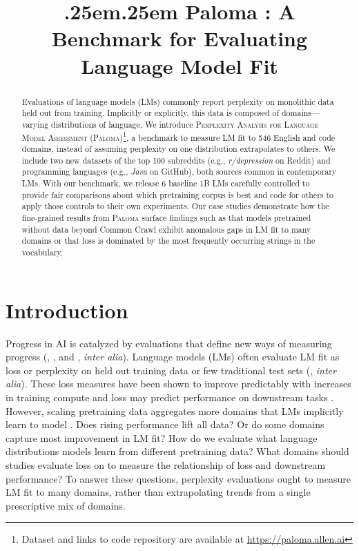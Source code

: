 \title{.25em{{.25em{ Paloma}}} : A Benchmark for Evaluating Language Model Fit}

\begin{abstract}
Evaluations of language models (LMs) commonly report perplexity on monolithic data held out from training. Implicitly or explicitly, this data is composed of domains—varying distributions of language. We introduce \textsc{Perplexity Analysis for Language Model Assessment} (\textsc{Paloma})\footnote{Dataset and links to code repository are available at \url{https://paloma.allen.ai}}, a benchmark to measure LM fit to 546 English and code domains, instead of assuming perplexity on one distribution extrapolates to others. We include two new datasets of the top 100 subreddits (e.g., \textit{r/depression} on Reddit) and programming languages (e.g., \textit{Java} on GitHub), both sources common in contemporary LMs. With our benchmark, we release 6 baseline 1B LMs carefully controlled to provide fair comparisons about which pretraining corpus is best and code for others to apply those controls to their own experiments. Our case studies demonstrate how the fine-grained results from \textsc{Paloma} surface findings such as that models pretrained without data beyond Common Crawl exhibit anomalous gaps in LM fit to many domains or that loss is dominated by the most frequently occurring strings in the vocabulary.
\end{abstract}

\section{Introduction}

Progress in AI is catalyzed by evaluations that define new ways of measuring progress (\citealp{imagenet}, \citealp{wang-etal-2018-glue}, and \citealp{superglue}, \textit{inter alia}). Language models (LMs) often evaluate LM fit as loss or perplexity \citep{Jelinek1977PerplexityaMO} on held out training data or few traditional test sets (\citealp{Chelba2013OneBW,Merity2016PointerSM}, \textit{inter alia}). These loss measures have been shown to improve predictably with increases in training compute \citep{Kaplan2020ScalingLF, Hoffmann2022TrainingCL} and loss may predict performance on downstream tasks \citep{Xia2022TrainingTO, Gadre2024LanguageMS, Du2024UnderstandingEA}. However, scaling pretraining data aggregates more domains that LMs implicitly learn to model \citep{Diaz2023ScalingLD, aharoni-goldberg-2020-unsupervised}. Does rising performance lift all data? Or do some domains capture most improvement in LM fit? How do we evaluate what language distributions models learn from different pretraining data? What domains should studies evaluate loss on to measure the relationship of loss and downstream performance? To answer these questions, perplexity evaluations ought to measure LM fit to many domains, rather than extrapolating trends from a single prescriptive mix of domains. 

